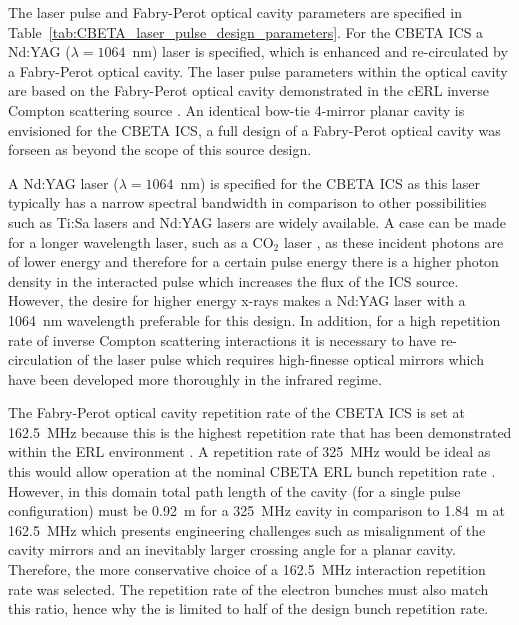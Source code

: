 \documentclass[../main.tex]{subfiles}
\begin{document}
The laser pulse and Fabry-Perot optical cavity parameters are specified in Table~\ref{tab:CBETA_laser_pulse_design_parameters}. For the CBETA ICS a Nd:YAG ($\lambda=1064$~\si{\nano\meter}) laser is specified, which is enhanced and re-circulated by a Fabry-Perot optical cavity. The laser pulse parameters within the optical cavity are based on the Fabry-Perot optical cavity demonstrated in the cERL inverse Compton scattering source \cite{akagi2016narrow}. An identical bow-tie 4-mirror planar cavity is envisioned for the CBETA ICS, a full design of a Fabry-Perot optical cavity was forseen as beyond the scope of this source design. 

A Nd:YAG laser ($\lambda = 1064$~\si{\nano\meter}) is specified for the CBETA ICS as this laser typically has a narrow spectral bandwidth in comparison to other possibilities such as Ti:Sa lasers and Nd:YAG lasers are widely available. A case can be made for a longer wavelength laser, such as a CO$_{2}$ laser \cite{pogorelsky2020converting}, as these incident photons are of lower energy and therefore for a certain pulse energy there is a higher photon density in the interacted pulse which increases the flux of the ICS source. However, the desire for higher energy x-rays makes a Nd:YAG laser with a 1064~\si{\nano\meter} wavelength preferable for this design. In addition, for a high repetition rate of inverse Compton scattering interactions it is necessary to have re-circulation of the laser pulse which requires high-finesse optical mirrors which have been developed more thoroughly in the infrared regime. 

The Fabry-Perot optical cavity repetition rate of the CBETA ICS is set at 162.5~\si{\mega\hertz} because this is the highest repetition rate that has been demonstrated within the ERL environment \cite{akagi2016narrow}. A repetition rate of 325~\si{\mega\hertz} would be ideal as this would allow operation at the nominal CBETA ERL bunch repetition rate \cite{hoffstaetter2017cbeta}. However, in this domain total path length of the cavity (for a single pulse configuration) must be 0.92~\si{\meter} for a 325~\si{\mega\hertz} cavity in comparison to 1.84~\si{\meter} at 162.5~\si{\mega\hertz} which presents engineering challenges such as misalignment of the cavity mirrors and an inevitably larger crossing angle for a planar cavity. Therefore, the more conservative choice of a 162.5~\si{\mega\hertz} interaction repetition rate was selected. The repetition rate of the electron bunches must also match this ratio, hence why the is limited to half of the design bunch repetition rate. 
\end{document}
